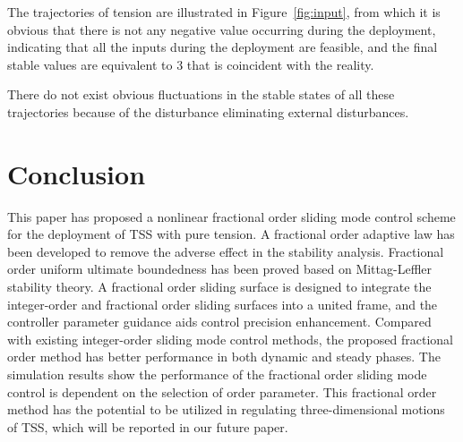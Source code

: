 \documentclass[ShortAfour]{sage}
\theoremstyle{plain}
\theoremstyle{remark}
\begin{document}
   The trajectories of tension are illustrated in Figure~\ref{fig:input}, from which it is obvious that there is not any negative value occurring during the deployment, indicating that all the inputs during the deployment are feasible, and the final stable values are equivalent to 3 that is coincident with the reality.
 
   There do not exist obvious fluctuations in the stable states of all these trajectories because of the disturbance eliminating external disturbances. 
\section{Conclusion}\label{sec:Conclusion} 
This paper has proposed a nonlinear fractional order sliding mode control scheme for the deployment of TSS with pure tension. A fractional order adaptive law has been developed to remove the adverse effect in the stability analysis. Fractional order uniform ultimate boundedness has been proved based on Mittag-Leffler stability theory. A fractional order sliding surface is designed to integrate the integer-order and fractional order sliding surfaces into a united frame, and the controller parameter guidance aids control precision enhancement. Compared with existing integer-order sliding mode control methods, the proposed fractional order method has better performance in both dynamic and steady phases. The simulation results show the performance of the fractional order sliding mode control is dependent on the selection of order parameter. This fractional order method has the potential to be utilized in regulating three-dimensional motions of TSS, which will be reported in our future paper. 
\end{document}
